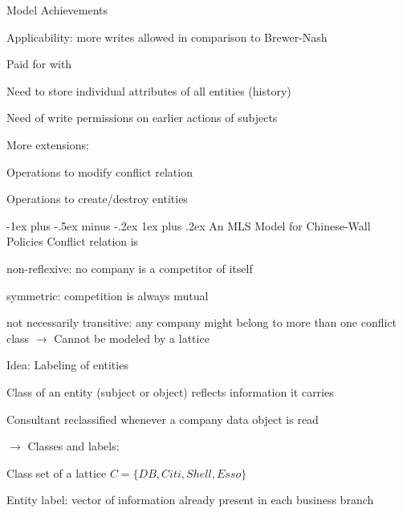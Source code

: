 \documentclass[a4paper]{article}
\makeatletter
\renewcommand{\subsubsection}{\@startsection{subsubsection}{3}{0mm}%
                {-1ex plus -.5ex minus -.2ex}%
                {1ex plus .2ex}%
                {\normalfont\small\bfseries}}
\makeatother
\begin{document}
\begin{multicols}{3}
    Model Achievements
    \begin{itemize*}
        \item Applicability: more writes allowed in comparison to Brewer-Nash
        \item Paid for with
        \begin{itemize*}
            \item Need to store individual attributes of all entities (history)
            \item Need of write permissions on earlier actions of subjects
        \end{itemize*}
        \item More extensions:
        \begin{itemize*}
            \item Operations to modify conflict relation
            \item Operations to create/destroy entities
        \end{itemize*}
    \end{itemize*}

    \subsubsection{An MLS Model for Chinese-Wall Policies}
    Conflict relation is
    \begin{itemize*}
        \item non-reflexive: no company is a competitor of itself
        \item symmetric: competition is always mutual
        \item not necessarily transitive: any company might belong to more than one conflict class $\rightarrow$ Cannot be modeled by a lattice
    \end{itemize*}

    Idea: Labeling of entities
    \begin{itemize*}
        \item Class of an entity (subject or object) reflects information it carries
        \item Consultant reclassified whenever a company data object is read
        \item[$\rightarrow$] Classes and labels:
        \item Class set of a lattice $C=\{DB,Citi,Shell,Esso\}$
        \item Entity label: vector of information already present in each business branch
    \end{itemize*}


\end{multicols}
\end{document}
